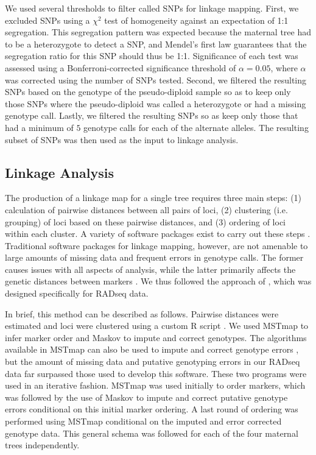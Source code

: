 \documentclass[11pt]{article}
\begin{document}
We used several thresholds to filter called SNPs for linkage mapping. First, 
we excluded SNPs using a $\chi^2$ test of homogeneity against an expectation of 1:1 segregation. This segregation pattern was expected because
the maternal tree had to be a heterozygote to detect a SNP, and Mendel's first law 
guarantees that the segregation ratio for this SNP should thus be 1:1. Significance of each test was 
assessed using a Bonferroni-corrected significance threshold of $\alpha = 0.05$, where $\alpha$ was corrected using the number of SNPs tested. 
Second, we filtered the resulting SNPs based on the genotype of the pseudo-diploid sample so as to keep only those SNPs
where the pseudo-diploid was called a heterozygote or had a missing genotype call.
Lastly, we filtered the resulting SNPs so as keep only those that had a minimum of $5$
genotype calls for each of the alternate alleles. The resulting subset of SNPs was then used as the input to linkage analysis. 

\subsection*{Linkage Analysis}\label{ss:linkage}

The production of a linkage map for a single tree requires three main steps: (1) calculation of 
pairwise distances between all pairs of loci, (2) clustering (i.e. grouping) of loci based on these pairwise distances, 
and (3) ordering of loci within each cluster.  A variety of software packages exist to carry out these steps \citep[e.g.,][]{VanOoijen:2011}.
Traditional software packages for linkage mapping, however, are not amenable to large amounts of missing data and frequent
errors in genotype calls. The former causes issues with all aspects of analysis, while the latter primarily affects the 
genetic distances between markers \citep{Cartwright:2007}. We thus followed the approach of \citet{Ward:2013}, 
which was designed specifically for RADseq data. 

In brief, this method can be described as follows. Pairwise distances were estimated and loci were clustered using a 
custom R script \citep[see File S2;][]{R:2013}. We used MSTmap \citep{Wu:2008a} 
to infer marker order and Maskov \citep{Ward:2013} to impute and correct genotypes. The algorithms available
in MSTmap can also be used to impute and correct genotype errors \citep[see][]{Wu:2008a}, but the amount of missing
data and putative genotyping errors in our RADseq data far surpassed those used to develop this software. These two programs
were used in an iterative fashion. MSTmap was used initially to order markers, which was followed by the use of Maskov
to impute and correct putative genotype errors conditional on this initial marker ordering. A last round of ordering 
was performed using MSTmap conditional on the imputed and error corrected genotype data. This general schema
was followed for each of the four maternal trees independently.
\end{document}
